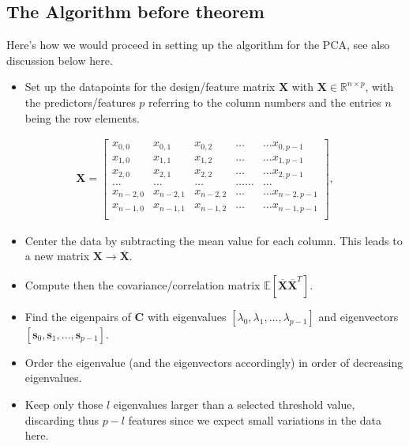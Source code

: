 \documentclass[letterpaper,10pt,english]{sphinxmanual}
\begin{document}
\subsection{The Algorithm before theorem}
\label{\detokenize{chapter8:the-algorithm-before-theorem}}
Here’s how we would proceed in setting up the algorithm for the PCA, see also discussion below here.
\begin{itemize}
\item {} 
Set up the datapoints for the design/feature matrix \(\boldsymbol{X}\) with \(\boldsymbol{X}\in {\mathbb{R}}^{n\times p}\), with the predictors/features \(p\)  referring to the column numbers and the entries \(n\) being the row elements.

\end{itemize}
\begin{equation*}
\begin{split}
\boldsymbol{X}=\begin{bmatrix}
x_{0,0} & x_{0,1} & x_{0,2}& \dots & \dots x_{0,p-1}\\
x_{1,0} & x_{1,1} & x_{1,2}& \dots & \dots x_{1,p-1}\\
x_{2,0} & x_{2,1} & x_{2,2}& \dots & \dots x_{2,p-1}\\
\dots & \dots & \dots & \dots \dots & \dots \\
x_{n-2,0} & x_{n-2,1} & x_{n-2,2}& \dots & \dots x_{n-2,p-1}\\
x_{n-1,0} & x_{n-1,1} & x_{n-1,2}& \dots & \dots x_{n-1,p-1}\\
\end{bmatrix},
\end{split}
\end{equation*}\begin{itemize}
\item {} 
Center the data by subtracting the mean value for each column. This leads to a new matrix \(\boldsymbol{X}\rightarrow \overline{\boldsymbol{X}}\).

\item {} 
Compute then the covariance/correlation matrix \(\mathbb{E}[\overline{\boldsymbol{X}}\overline{\boldsymbol{X}}^T]\).

\item {} 
Find the eigenpairs of \(\boldsymbol{C}\) with eigenvalues \([\lambda_0,\lambda_1,\dots,\lambda_{p-1}]\) and eigenvectors \([\boldsymbol{s}_0,\boldsymbol{s}_1,\dots,\boldsymbol{s}_{p-1}]\).

\item {} 
Order the eigenvalue (and the eigenvectors accordingly) in order of decreasing eigenvalues.

\item {} 
Keep only those \(l\) eigenvalues larger than a selected threshold value, discarding thus \(p-l\) features since we expect small variations in the data here.

\end{itemize}
\end{document}
